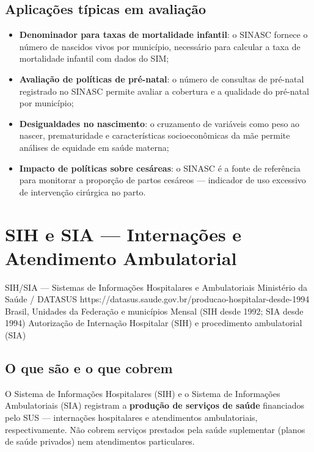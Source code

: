 \subsection{Aplicações típicas em avaliação}

\begin{itemize}
  \item \textbf{Denominador para taxas de mortalidade infantil}: o SINASC fornece o número de nascidos vivos por município, necessário para calcular a taxa de mortalidade infantil com dados do SIM;
  \item \textbf{Avaliação de políticas de pré-natal}: o número de consultas de pré-natal registrado no SINASC permite avaliar a cobertura e a qualidade do pré-natal por município;
  \item \textbf{Desigualdades no nascimento}: o cruzamento de variáveis como peso ao nascer, prematuridade e características socioeconômicas da mãe permite análises de equidade em saúde materna;
  \item \textbf{Impacto de políticas sobre cesáreas}: o SINASC é a fonte de referência para monitorar a proporção de partos cesáreos --- indicador de uso excessivo de intervenção cirúrgica no parto.
\end{itemize}

\section{SIH e SIA --- Internações e Atendimento Ambulatorial}

\ficharapida
  {SIH/SIA --- Sistemas de Informações Hospitalares e Ambulatoriais}
  {Ministério da Saúde / DATASUS}
  {https://datasus.saude.gov.br/producao-hospitalar-desde-1994}
  {Brasil, Unidades da Federação e municípios}
  {Mensal (SIH desde 1992; SIA desde 1994)}
  {Autorização de Internação Hospitalar (SIH) e procedimento ambulatorial (SIA)}

\subsection{O que são e o que cobrem}

O Sistema de Informações Hospitalares (SIH) e o Sistema de Informações Ambulatoriais (SIA) registram a \textbf{produção de serviços de saúde} financiados pelo SUS --- internações hospitalares e atendimentos ambulatoriais, respectivamente. Não cobrem serviços prestados pela saúde suplementar (planos de saúde privados) nem atendimentos particulares.


